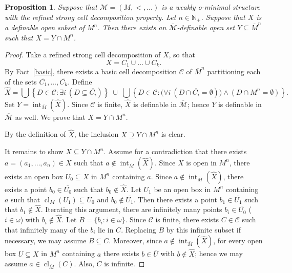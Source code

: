 \documentclass{amsart}
\theoremstyle{definition}
\theoremstyle{plain}
\newtheorem{proposition}[definition]{Proposition}
\newcommand{\bN}{\mathbb N}
\newcommand{\ov}[1]{\overline{#1}}
\def \M {{\mathcal M}}
\DeclareMathOperator{\Int}{int}
\DeclareMathOperator{\cl}{cl}
\begin{document}

\begin{proposition} \label{open}
Suppose that $\mathcal M = (M, <, \ldots)$ is a weakly o-minimal structure with the refined strong cell decomposition property.
Let $n \in \bN_{+}$.
Suppose that  $X$ is a definable open subset of $M^n$.
Then there exists an $\overline{\M}$-definable open set $Y \subseteq \overline{M}^n$ such that
$X = Y \cap M^n$.
\end{proposition}


\begin{proof}
	Take a refined strong cell decomposition of $X$, so that
	\[
	X = C_1 \cup \dots \cup C_k.
	\]
	By Fact~\ref{basic},
	there exists a basic cell decomposition $\mathcal{C}$ of $\overline{M}^n$ partitioning each of the sets $\ov{C_1},\dots, \ov{C_k}$.
	Define
	\[
	\hat{X}
	= \bigcup \left\{ D\in \mathcal{C} : \exists i\ (D \subseteq \overline{C_i}) \right\}
	\;\cup\;
	\bigcup \left\{ D\in \mathcal{C} : \bigl(\forall i\ (D \cap \overline{C_i} = \emptyset)\bigr) \wedge (D \cap M^n = \emptyset) \right\}.
	\]
	Set $Y = \Int_{\overline{M}}(\hat{X})$.
	Since $\mathcal{C}$ is finite, $\hat{X}$ is definable in $\overline{\M}$; hence $Y$ is definable  in $\overline{\M}$ as well.
	We prove that $X = Y \cap M^n$.
	
	By the definition of $\hat{X}$, the inclusion $X \supseteq Y \cap M^n$ is clear.
	
	It remains to show $X \subseteq Y \cap M^n$.
	Assume for a contradiction that there exists $a=(a_1,\dots,a_n)\in X$ such that
	$a \notin \Int_{\overline{M}}(\hat{X})$.
	Since $X$ is open in $M^n$, there exists an open box $U_0 \subseteq X$ in $M^n$ containing $a$.
	Since $a \notin \operatorname{int}_{\overline{M}}(\hat{X})$, there exists a point $b_0 \in \overline{U_0}$ such that $b_0 \notin \hat{X}$.
	Let $U_1$ be an open box in $M^n$ containing $a$ such that
	$\cl_M(U_1) \subseteq U_0$ and $b_0 \notin \overline{U_1}$.
	Then there exists a point $b_1 \in \overline{U_1}$ such that $b_1 \notin \hat{X}$.
	Iterating this argument, there are infinitely many points
	$b_i \in \overline{U_0}$ ($i\in\omega$) with $b_i \notin \hat{X}$.
	Let $B = \{ b_i : i \in \omega \}$.
	Since $\mathcal{C}$ is finite, there exists $C \in \mathcal{C}$ such that infinitely many of the $b_i$ lie in $C$.
	Replacing $B$ by this infinite subset if necessary, we may assume $B \subseteq C$.
	Moreover, since $a \notin \Int_{\overline{M}}(\hat{X})$, for every open box $U \subseteq X$ in $M^n$ containing $a$ there exists $b \in \overline{U}$ with $b \notin \hat{X}$;
	hence we may assume $a \in \cl_{\overline{M}}(C)$.
	Also, $C$ is infinite.
	

\end{proof}
\end{document}

